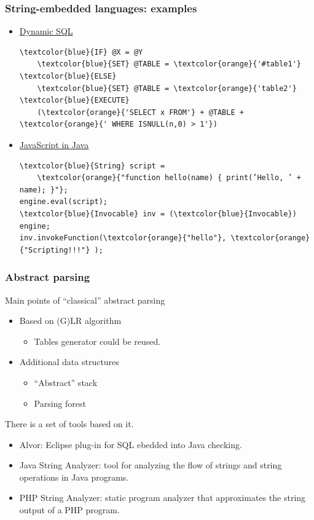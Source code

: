 \documentclass{beamer}
\begin{document}
\begin{frame}[fragile]
	\transwipe[direction=90]
	\frametitle{String-embedded languages: examples}
	\begin{itemize}
		\item \underline{Dynamic SQL}
		\begin{Verbatim}[commandchars=\\\{\}]
\textcolor{blue}{IF} @X = @Y
    \textcolor{blue}{SET} @TABLE = \textcolor{orange}{'#table1'}
\textcolor{blue}{ELSE}
    \textcolor{blue}{SET} @TABLE = \textcolor{orange}{'table2'}
\textcolor{blue}{EXECUTE} 
    (\textcolor{orange}{'SELECT x FROM'} + @TABLE + \textcolor{orange}{' WHERE ISNULL(n,0) > 1'})
		\end{Verbatim}
		\item \underline{JavaScript in Java}
		\begin{Verbatim}[commandchars=\\\{\}]
\textcolor{blue}{String} script =
    \textcolor{orange}{"function hello(name) { print(’Hello, ’ + name); }"};
engine.eval(script);
\textcolor{blue}{Invocable} inv = (\textcolor{blue}{Invocable}) engine;
inv.invokeFunction(\textcolor{orange}{"hello"}, \textcolor{orange}{"Scripting!!!"} );
        \end{Verbatim}
	\end{itemize}
\end{frame}

\begin{frame}[fragile]
	\transwipe[direction=90]
	\frametitle{Abstract parsing}
	Main points of “classical” abstract parsing
	\begin{itemize}
	    \item Based on (G)LR algorithm
	    \begin{itemize}
            \item Tables generator could be reused.
        \end{itemize}
        \item Additional data structures
        \begin{itemize}
            \item “Abstract” stack
            \item Parsing forest
        \end{itemize}
    \end{itemize}
    There is a set of tools based on it.
    \begin{itemize}
        \item Alvor: Eclipse plug-in for SQL ebedded into Java checking.
        \item Java String Analyzer: tool for analyzing the flow of strings and string operations in Java programs.
        \item PHP String Analyzer: static program analyzer that approximates the string output of a PHP program.
    \end{itemize}
\end{frame}
\end{document}
